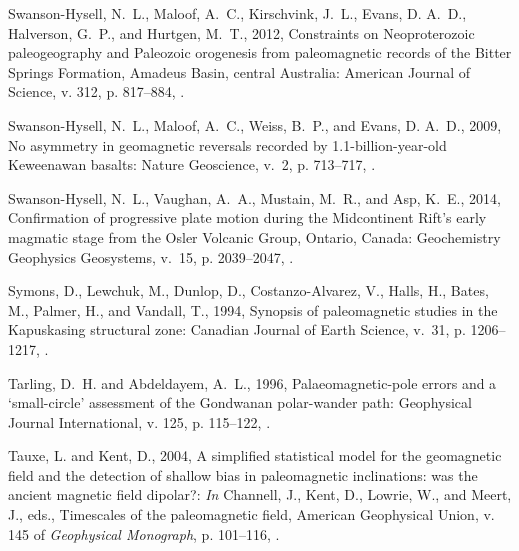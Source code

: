 \documentclass[11pt,letterpaper]{article}
\begin{document}
\begin{thebibliography}{153}
Swanson-Hysell, N.~L., Maloof, A.~C., Kirschvink, J.~L., Evans, D. A.~D.,
  Halverson, G.~P., and Hurtgen, M.~T., 2012, Constraints on {N}eoproterozoic
  paleogeography and {P}aleozoic orogenesis from paleomagnetic records of the
  {B}itter {S}prings {F}ormation, {A}madeus {B}asin, central {A}ustralia:
  American Journal of Science, v. 312, p. 817--884, .

Swanson-Hysell, N.~L., Maloof, A.~C., Weiss, B.~P., and Evans, D. A.~D., 2009,
  No asymmetry in geomagnetic reversals recorded by 1.1-billion-year-old
  {K}eweenawan basalts: Nature Geoscience, v.~2, p. 713--717,
  .

Swanson-Hysell, N.~L., Vaughan, A.~A., Mustain, M.~R., and Asp, K.~E.,
  2014{}, {Confirmation of progressive plate motion during the
  Midcontinent Rift's early magmatic stage from the Osler Volcanic Group,
  Ontario, Canada}: Geochemistry Geophysics Geosystems, v.~15, p. 2039--2047,
  .

Symons, D., Lewchuk, M., Dunlop, D., Costanzo-{A}lvarez, V., Halls, H., Bates,
  M., Palmer, H., and Vandall, T., 1994, Synopsis of paleomagnetic studies in
  the {K}apuskasing structural zone: Canadian Journal of Earth Science, v.~31,
  p. 1206--1217, .

Tarling, D.~H. and Abdeldayem, A.~L., 1996, Palaeomagnetic-pole errors and a
  `small-circle' assessment of the {G}ondwanan polar-wander path: Geophysical
  Journal International, v. 125, p. 115--122,
  .

Tauxe, L. and Kent, D., 2004, A simplified statistical model for the
  geomagnetic field and the detection of shallow bias in paleomagnetic
  inclinations: was the ancient magnetic field dipolar?: \emph{In} Channell,
  J., Kent, D., Lowrie, W., and Meert, J., eds., Timescales of the
  paleomagnetic field, American Geophysical Union, v. 145 of \emph{Geophysical
  Monograph}, p. 101--116, .


\end{thebibliography}
\end{document}

